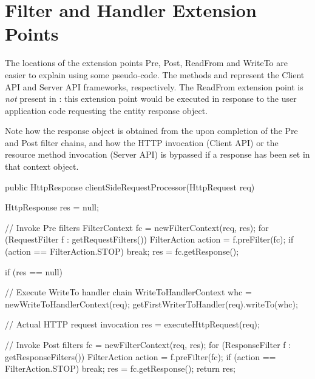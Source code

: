 \chapter{Filter and Handler Extension Points}
\label{extension_points}

The locations of the extension points Pre, Post, ReadFrom and WriteTo are easier to explain using some pseudo-code. The methods  and  represent the Client API and Server API frameworks, respectively. The ReadFrom extension point is \emph{not} present in : this extension point would be executed in response to the user application code requesting the entity response object. 

Note how the response object is obtained from the  upon completion of the Pre and Post filter chains, and how the HTTP invocation (Client API) or the resource method invocation (Server API) is bypassed if a response has been set in that context object. 

\begin{listing}{1}
public HttpResponse clientSideRequestProcessor(HttpRequest req) {
    HttpResponse res = null;

    // Invoke Pre filters
    FilterContext fc = newFilterContext(req, res);
    for (RequestFilter f : getRequestFilters()) {
        FilterAction action = f.preFilter(fc);
        if (action == FilterAction.STOP) break;
    }
    res = fc.getResponse();

    if (res == null) {
        // Execute WriteTo handler chain
        WriteToHandlerContext whc = newWriteToHandlerContext(req);
        getFirstWriterToHandler(req).writeTo(whc);

        // Actual HTTP request invocation
        res = executeHttpRequest(req);
    }

    // Invoke Post filters
    fc = newFilterContext(req, res);
    for (ResponseFilter f : getResponseFilters()) {
        FilterAction action = f.preFilter(fc);
        if (action == FilterAction.STOP) break;
    }
    res = fc.getResponse();       
    return res;
}
\end{listing}

